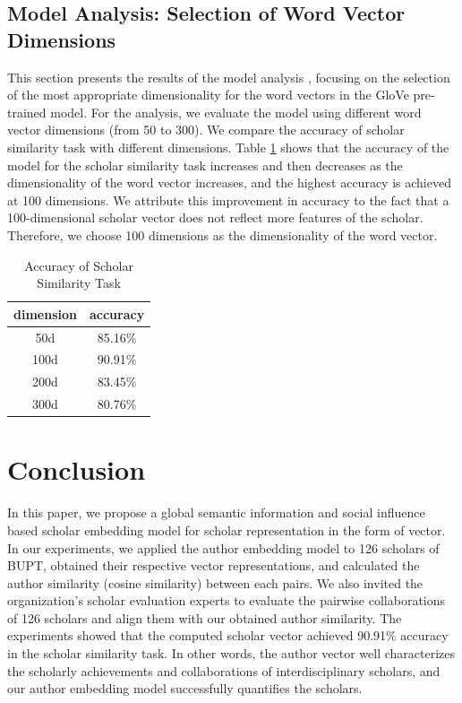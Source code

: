 \documentclass[conference]{IEEEtran}
\begin{document}
\subsection{Model Analysis: Selection of Word Vector Dimensions}
This section presents the results of the model analysis \cite{8318770}, focusing on the
selection of the most appropriate dimensionality for the word vectors in
the GloVe pre-trained model. For the analysis, we evaluate the model
using different word vector dimensions (from 50 to 300). We compare the
accuracy of scholar similarity task with different dimensions.
Table \ref{tab:addlabel} shows that the accuracy of the model for the scholar
similarity task increases and then decreases as the dimensionality of
the word vector increases, and the highest accuracy is achieved at 100
dimensions. We attribute this improvement in accuracy to the fact that a
100-dimensional scholar vector does not reflect more features of the
scholar. Therefore, we choose 100 dimensions as the dimensionality of the
word vector.

\begin{table}[htbp]
  \centering
  \caption{Accuracy of Scholar Similarity Task}
    \begin{tabular}{cc}
    \toprule
    \multicolumn{1}{l}{dimension} & \multicolumn{1}{l}{accuracy} \\
    \midrule
    50d   & 85.16\% \\
    100d  & 90.91\% \\
    200d  & 83.45\% \\
    300d  & 80.76\% \\
    \bottomrule
    \end{tabular}%
  \label{tab:addlabel}%
\end{table}%



\newpage
\section{Conclusion}
In this paper, we propose a global semantic information and social influence
based scholar embedding model for scholar representation in the form of vector.
In our experiments, we applied the author embedding model to 126 scholars of BUPT,
obtained their respective vector representations, and calculated the 
author similarity (cosine similarity) between each pairs. We also invited the organization's scholar evaluation experts to evaluate the pairwise collaborations of 126 scholars and align them with our obtained author similarity. The experiments showed that the computed scholar vector 
achieved 90.91\% accuracy in the scholar similarity task. In other words, 
the author vector well characterizes the scholarly achievements and 
collaborations of interdisciplinary scholars, and our author embedding 
model successfully quantifies the scholars.
\end{document}
